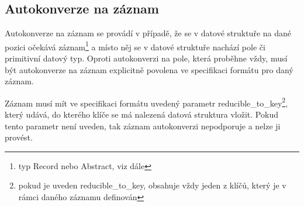 \documentclass[FM,bw,DP]{tulthesis}
\begin{document}
\subsection{Autokonverze na záznam}

Autokonverze na záznam se provádí v případě, že se v datové struktuře na dané pozici očekává záznam\footnote{typ Record nebo Abstract, viz dále} a místo něj se v datové struktuře nachází pole či primitivní datový typ. Oproti autokonverzi na pole, která proběhne vždy, musí být autokonverze na záznam explicitně povolena ve specifikaci formátu pro daný záznam.

Záznam musí mít ve specifikaci formátu uvedený parametr reducible\_to\_key\footnote{pokud je uveden reducible\_to\_key, obsahuje vždy jeden z klíčů, který je v rámci daného záznamu definován}, který udává, do kterého klíče se má nalezená datová struktura vložit. Pokud tento parametr není uveden, tak záznam autokonverzi nepodporuje a nelze ji provést.
\end{document}
